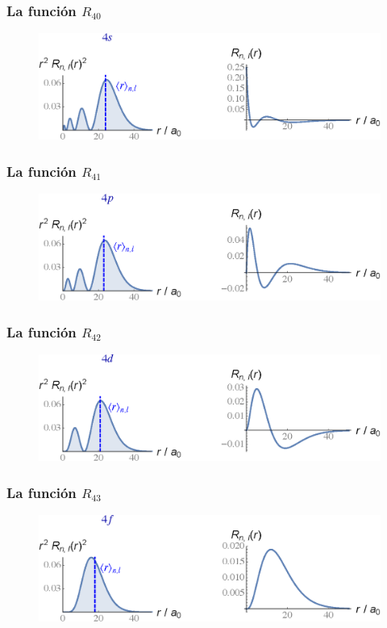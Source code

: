 \begin{frame}
\frametitle{La función $R_{40}$}
\begin{figure}
   \centering
   \includegraphics[scale=0.67]{Imagenes/Plot_Funcion_Radial_40.eps}
\end{figure}
\end{frame}
\begin{frame}
\frametitle{La función $R_{41}$}
\begin{figure}
   \centering
   \includegraphics[scale=0.67]{Imagenes/Plot_Funcion_Radial_41.eps}
\end{figure}
\end{frame}
\begin{frame}
\frametitle{La función $R_{42}$}
\begin{figure}
   \centering
   \includegraphics[scale=0.67]{Imagenes/Plot_Funcion_Radial_42.eps}
\end{figure}
\end{frame}
\begin{frame}
\frametitle{La función $R_{43}$}
\begin{figure}
   \centering
   \includegraphics[scale=0.67]{Imagenes/Plot_Funcion_Radial_43.eps}
\end{figure}
\end{frame}
